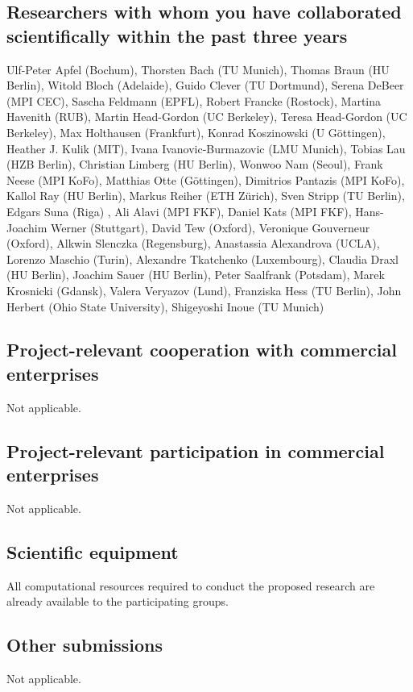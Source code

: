 \documentclass[a4paper,11pt,headings=normal]{scrartcl}
\begin{document}
\subsection{Researchers with whom you have collaborated scientifically 
	within the past three years}
Ulf-Peter Apfel (Bochum), Thorsten Bach (TU Munich), Thomas Braun (HU Berlin), Witold Bloch (Adelaide), Guido Clever (TU Dortmund),
Serena DeBeer (MPI CEC), Sascha Feldmann (EPFL), Robert Francke (Rostock), Martina Havenith (RUB), Martin Head-Gordon (UC Berkeley), Teresa Head-Gordon (UC Berkeley), Max Holthausen (Frankfurt), Konrad Koszinowski (U Göttingen), Heather J. Kulik (MIT), Ivana Ivanovic-Burmazovic (LMU Munich),
Tobias Lau (HZB Berlin), Christian Limberg (HU Berlin), Wonwoo Nam (Seoul), 
Frank Neese (MPI KoFo), Matthias Otte (G\"ottingen), Dimitrios Pantazis (MPI 
KoFo), Kallol Ray (HU Berlin), Markus Reiher (ETH Zürich), Sven Stripp (TU Berlin), Edgars Suna (Riga)
, Ali Alavi (MPI FKF), Daniel Kats (MPI FKF), Hans-Joachim Werner (Stuttgart), David Tew (Oxford), Veronique Gouverneur (Oxford), Alkwin Slenczka (Regensburg), Anastassia Alexandrova (UCLA), Lorenzo Maschio (Turin), Alexandre Tkatchenko (Luxembourg), Claudia Draxl (HU Berlin), Joachim Sauer (HU Berlin), Peter Saalfrank (Potsdam), Marek Krosnicki (Gdansk), Valera Veryazov (Lund), Franziska Hess (TU Berlin), John Herbert (Ohio State University), Shigeyoshi Inoue (TU Munich)

\ifoot{}
\ofoot{}

\subsection{Project-relevant cooperation with commercial enterprises}
Not applicable. 

\subsection{Project-relevant participation in commercial enterprises}
Not applicable. 

\subsection{Scientific equipment}
All computational resources required to conduct the proposed research are 
already available to the participating groups. 

\subsection{Other submissions}
Not applicable. 
\end{document}
